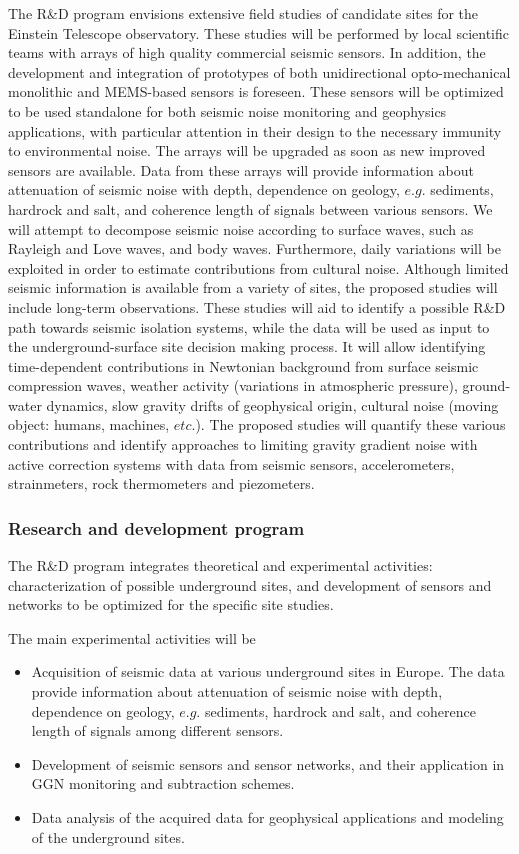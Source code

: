 The R\&D program envisions extensive field studies of candidate sites for the Einstein Telescope observatory. These studies will be performed by local scientific teams with arrays of high quality commercial seismic sensors. In addition, the development and integration of prototypes of both unidirectional opto-mechanical monolithic and MEMS-based sensors is foreseen. These sensors will be optimized to be used standalone for both seismic noise monitoring and geophysics applications, with particular attention in their design to the necessary immunity to environmental noise. The arrays will be upgraded as soon as new improved sensors are available.
Data from these arrays will provide information about attenuation of seismic noise with depth, dependence on geology, $e.g.$ sediments, hardrock and salt, and coherence length of signals between various sensors. We will attempt to decompose seismic noise according to surface waves, such as Rayleigh and Love waves, and body waves. Furthermore, daily variations will be exploited in order to estimate contributions from cultural noise. Although limited seismic information is available from a variety of sites, the proposed studies will include long-term observations. These studies will aid to identify a possible R\&D path towards seismic isolation systems, while the data will be used as input to the underground-surface site decision making process. It will allow identifying time-dependent contributions in Newtonian background from surface seismic compression waves, weather activity (variations in atmospheric pressure), ground-water dynamics, slow gravity drifts of geophysical origin, cultural noise (moving object: humans, machines, $etc.$). The proposed studies will quantify these various contributions and identify approaches to limiting gravity gradient noise with active correction systems with data from seismic sensors, accelerometers, strainmeters, rock thermometers and piezometers.

\FloatBarrier
\subsubsection{Research and development program}
The R\&D program integrates theoretical and experimental activities: characterization of possible underground sites, and development of sensors and networks to be optimized for the specific site studies. 

The main experimental activities will be
\begin{itemize}
\item{} Acquisition of seismic data at various underground sites in Europe. The data provide information about attenuation of seismic noise with depth, dependence on geology, $e.g.$ sediments, hardrock and salt, and coherence length of signals among different sensors.
\item{} Development of seismic sensors and sensor networks, and their application in GGN monitoring and subtraction schemes. 
\item{} Data analysis of the acquired data for geophysical applications and modeling of the underground sites.
\end{itemize}

